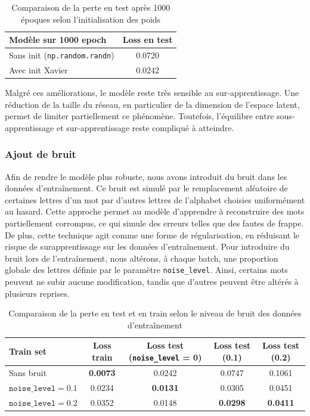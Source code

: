 \documentclass{article}
\begin{document}
\begin{table}[H]
\centering
\begin{tabular}{lc}
\hline
\textbf{Modèle sur 1000 epoch} & \textbf{Loss en test} \\
\hline
Sans init (\texttt{np.random.randn}) & 0.0720 \\
Avec init Xavier & 0.0242 \\
\hline
\end{tabular}
\caption{Comparaison de la perte en test après 1000 époques selon l'initialisation des poids}
\end{table}

Malgré ces améliorations, le modèle reste très sensible au sur-apprentissage. Une réduction de la taille du réseau, en particulier de la dimension de l’espace latent, permet de limiter partiellement ce phénomène. Toutefois, l’équilibre entre sous-apprentissage et sur-apprentissage reste compliqué à atteindre.

\subsubsection{Ajout de bruit}

Afin de rendre le modèle plus robuste, nous avons introduit du bruit dans les données d’entraînement. Ce bruit est simulé par le remplacement aléatoire de certaines lettres d’un mot par d’autres lettres de l’alphabet choisies uniformément au hasard. Cette approche permet au modèle d’apprendre à reconstruire des mots partiellement corrompus, ce qui simule des erreurs telles que des fautes de frappe. De plus, cette technique agit comme une forme de régularisation, en réduisant le risque de surapprentissage sur les données d'entraînement. Pour introduire du bruit lors de l'entraînement, nous altérons, à chaque batch, une proportion globale des lettres définie par le paramètre \texttt{noise\_level}. Ainsi, certains mots peuvent ne subir aucune modification, tandis que d’autres peuvent être altérés à plusieurs reprises.


\begin{table}[H]
\centering
\begin{tabular}{lcccc}
\hline
\textbf{Train set} & \textbf{Loss train} & \textbf{Loss test (\texttt{noise\_level} = 0)} & \textbf{Loss test (0.1)} & \textbf{Loss test (0.2)} \\
\hline
Sans bruit & \textbf{0.0073} & 0.0242 & 0.0747 & 0.1061 \\
$\texttt{noise\_level} = 0.1$ & 0.0234 & \textbf{0.0131} & 0.0305 & 0.0451  \\
$\texttt{noise\_level} = 0.2$ & 0.0352 & 0.0148 & \textbf{0.0298} & \textbf{0.0411} \\
\hline
\end{tabular}
\caption{Comparaison de la perte en test et en train selon le niveau de bruit des données d'entraînement}
\end{table}
\end{document}
